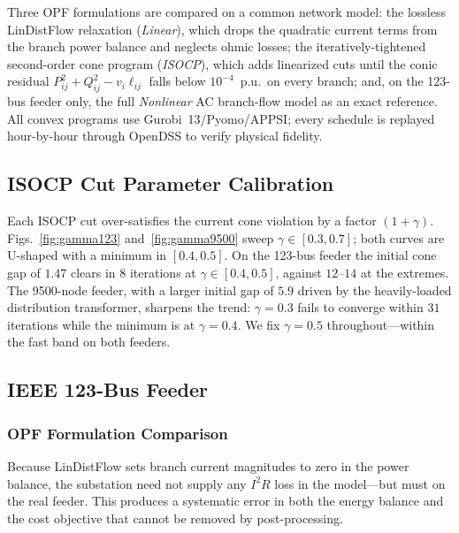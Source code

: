Three OPF formulations are compared on a common network model: the lossless
LinDistFlow relaxation (\emph{Linear}), which drops the quadratic current terms
from the branch power balance and neglects ohmic losses; the
iteratively-tightened second-order cone program (\emph{ISOCP}), which adds
linearized cuts until the conic residual $P_{ij}^2 + Q_{ij}^2 - v_i\ell_{ij}$
falls below $10^{-4}$~p.u.\ on every branch; and, on the 123-bus feeder only,
the full \emph{Nonlinear} AC branch-flow model as an exact reference. All
convex programs use Gurobi~13/Pyomo/APPSI; every schedule is replayed
hour-by-hour through OpenDSS to verify physical fidelity.

\subsection{ISOCP Cut Parameter Calibration}
\label{ssec:gamma}

Each ISOCP cut over-satisfies the current cone violation by a factor
$(1{+}\gamma)$. Figs.~\ref{fig:gamma123} and~\ref{fig:gamma9500} sweep
$\gamma\!\in\![0.3,0.7]$; both curves are U-shaped with a minimum in
$[0.4,0.5]$. On the 123-bus feeder the initial cone gap of $1.47$ clears in
$8$ iterations at $\gamma\!\in\![0.4,0.5]$, against $12$--$14$ at the extremes.
The 9500-node feeder, with a larger initial gap of $5.9$ driven by the
heavily-loaded distribution transformer, sharpens the trend: $\gamma\!=\!0.3$
fails to converge within $31$ iterations while the minimum is at $\gamma\!=\!0.4$.
We fix $\gamma\!=\!0.5$ throughout---within the fast band on both feeders.

\subsection{IEEE 123-Bus Feeder}
\label{ssec:case123}

\subsubsection{OPF Formulation Comparison}
\label{sssec:123_valid}

Because LinDistFlow sets branch current magnitudes to zero in the power balance,
the substation need not supply any $I^2R$ loss in the model---but must on the
real feeder. This produces a systematic error in both the energy balance and the
cost objective that cannot be removed by post-processing.

